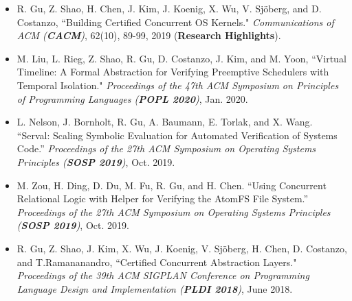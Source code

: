 \documentclass[10pt]{article}
\newenvironment{innerlist}[1][\enskip\textbullet]%
        {\begin{itemize}[#1,leftmargin=25pt,parsep=0pt,itemsep=2pt,topsep=2pt,partopsep=0pt]}
        {\end{itemize}}
\begin{document}
\begin{innerlist}
%
%
%
\item[] R. Gu, Z. Shao, H. Chen, J. Kim, J. Koenig, X. Wu, V. Sj\"{o}berg, and D. Costanzo, ``Building Certified Concurrent OS Kernels." \emph{Communications of ACM (\textbf{CACM})}, 62(10), 89-99, 2019  (\textbf{Research Highlights}).

\vspace{.1in}

\item[] M. Liu, L. Rieg, Z. Shao, R. Gu, D. Costanzo, J. Kim, and M. Yoon, ``Virtual Timeline: A Formal Abstraction for Verifying Preemptive Schedulers with Temporal Isolation." \emph{Proceedings of the 47th ACM Symposium on Principles of Programming Languages (\textbf{POPL 2020})}, Jan. 2020.

\vspace{.1in}

\item[]  L. Nelson, J. Bornholt, R. Gu, A. Baumann, E. Torlak, and X. Wang. ``Serval: Scaling Symbolic Evaluation for Automated
              Verification of Systems Code.'' \emph{Proceedings of the 27th ACM Symposium on Operating Systems Principles (\textbf{SOSP 2019})}, Oct. 2019.    
            
\vspace{.1in}

\item[]  M. Zou, H. Ding, D. Du, M. Fu, R. Gu, and H. Chen. ``Using Concurrent Relational Logic with Helper for Verifying the AtomFS File System.'' \emph{Proceedings of the 27th ACM Symposium on Operating Systems Principles (\textbf{SOSP 2019})}, Oct. 2019.
           
\vspace{.1in}




\item[] R. Gu, Z. Shao, J. Kim, X. Wu, J. Koenig, V. Sj\"{o}berg, H. Chen, D. Costanzo, and T.Ramananandro, ``Certified Concurrent Abstraction Layers." \emph{Proceedings of the 39th ACM SIGPLAN Conference on Programming Language Design and Implementation (\textbf{PLDI 2018})}, June 2018.


\end{innerlist}
\end{document}
